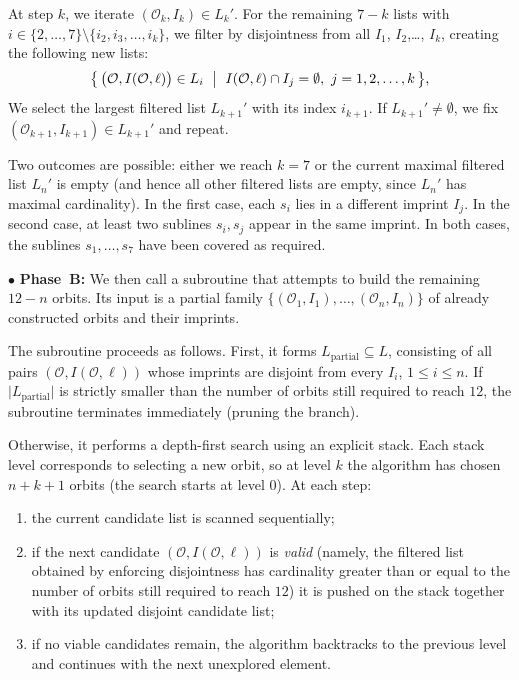\documentclass[a4paper, 11pt]{article}
\theoremstyle{definition}
\theoremstyle{definition}
\theoremstyle{definition}
\numberwithin{equation}{section}
\begin{document}
At step $k$, we iterate 
$(\mathcal{O}_k,I_k)\in L_k'$. For the  remaining $7-k$ lists with
$i\in\{2,\dots,7\}\setminus\{i_2,i_3,\dots,i_k\}$, we filter by disjointness from all $I_1$, $I_2$,\dots, $I_k$, creating the following new lists:
\begin{equation*}
	\bigl\{\,\big(\mathcal{O}, I (\mathcal{O},\ell) \big)\in L_i \ \bigm|\ I(\mathcal{O},\ell)\cap I_j=\emptyset,\ j=1,2,\dots,k\,\bigr\},
\end{equation*}
We select the largest filtered list $L_{k+1}'$ with its index $i_{k+1}$. If
$L_{k+1}'\neq\emptyset$, we fix $(\mathcal{O}_{k+1},I_{k+1})\in L_{k+1}'$ and repeat. 


Two outcomes are possible: either we reach $k=7$ or the current maximal
filtered list $L_n'$ is empty (and hence all other filtered lists are empty,
since $L_n'$ has maximal cardinality). In the first case, each $s_i$ lies in a
different imprint $I_j$. In the second case, at least two sublines $s_i,s_j$
appear in the same imprint. In both cases, the sublines $s_1,\dots,s_7$ have
been covered as required.

$\bullet$ \textbf{Phase~B:} We then call a subroutine that attempts to build the remaining $12-n$ orbits.
Its input is a partial family
$\{(\mathcal{O}_1,I_1),\dots,(\mathcal{O}_n,I_n)\}$ of already constructed orbits and
their imprints.

The subroutine proceeds as follows. First, it forms
$L_{\text{partial}}\subseteq L$, consisting of all pairs $(\mathcal{O},I(\mathcal{O},\ell))$ whose
imprints are disjoint from every $I_i$, $1\le i\le n$.
If $\lvert L_{\text{partial}}\rvert$ is strictly smaller than the number of
orbits still required to reach $12$, the subroutine terminates immediately
(pruning the branch).

Otherwise, it performs a depth-first search using an explicit stack. Each stack
level corresponds to selecting a new orbit, so at level $k$ the algorithm has
chosen $n+k+1$ orbits (the search starts at level $0$). At each step:
\begin{enumerate}
	\item the current candidate list is scanned sequentially;
	\item if the next candidate $(\mathcal{O},I(\mathcal{O},\ell))$ is \emph{valid} (namely, the
	filtered list obtained by enforcing disjointness has cardinality
	greater than or equal to the number of orbits still required to reach
	$12$) it is pushed on the stack together with its updated disjoint
	candidate list;
	\item if no viable candidates remain, the algorithm backtracks to the
	previous level and continues with the next unexplored element.
\end{enumerate}
\end{document}
